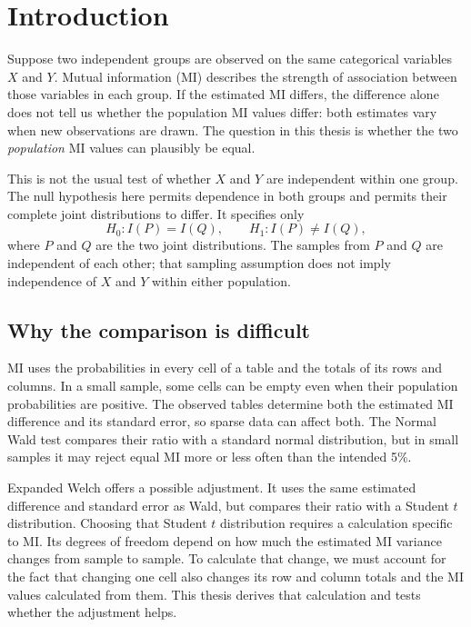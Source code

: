 \chapter{Introduction}
\label{chap:introduction}

Suppose two independent groups are observed on the same categorical variables
\(X\) and \(Y\). Mutual information (MI) describes the strength of association
between those variables in each group. If the estimated MI differs, the
difference alone does not tell us whether the population MI values differ:
both estimates vary when new observations are drawn. The question in this thesis is whether
the two \emph{population} MI values can plausibly be equal.

This is not the usual test of whether \(X\) and \(Y\) are independent within
one group. The null hypothesis here permits dependence in both groups and
permits their complete joint distributions to differ. It specifies only
\begin{equation}
  H_0:I(P)=I(Q),
  \qquad H_1:I(P)\ne I(Q),
  \label{eq:introduction-null}
\end{equation}
where \(P\) and \(Q\) are the two joint distributions. The samples from
\(P\) and \(Q\) are independent of each other; that sampling assumption does
not imply independence of \(X\) and \(Y\) within either population.

\section{Why the comparison is difficult}

MI uses the probabilities in every cell of a table and the totals of its rows
and columns. In a small sample, some cells can be empty even when their
population probabilities are positive. The observed tables determine both
the estimated MI difference and its standard error, so sparse data can affect
both. The Normal Wald test compares their ratio with a standard normal
distribution, but in
small samples it may reject equal MI more or less often than the intended 5\%.

Expanded Welch offers a possible adjustment. It uses the same estimated
difference and standard error as Wald, but compares their ratio with a
Student \(t\) distribution.
Choosing that Student \(t\) distribution requires a calculation specific to
MI. Its degrees of freedom depend on how much
the estimated MI variance changes from sample to sample. To calculate that
change, we must account for the fact that changing one cell also changes its
row and column totals and the MI values calculated from them. This thesis
derives that calculation and tests whether the adjustment helps.

